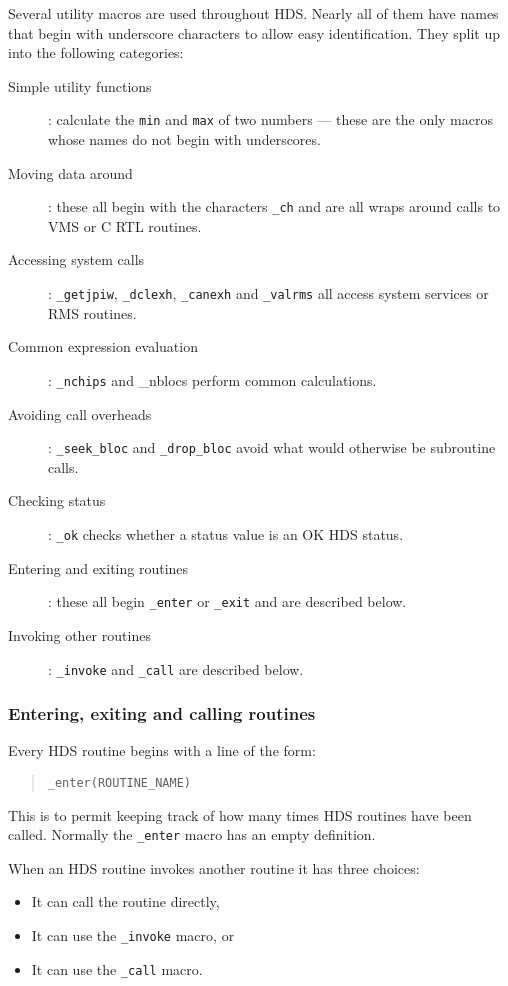 Several utility macros are used throughout HDS. Nearly all of them have
names that begin with underscore characters to allow easy identification.
They split up into the following categories:

\begin {description}
\item [Simple utility functions]: calculate the {\tt min} and {\tt max} of two
numbers --- these are the only macros whose names do not begin with underscores.
\item [Moving data around]: these all begin with the characters {\tt \_ch}
and are all wraps around calls to VMS or C RTL routines.
\item [Accessing system calls]: {\tt \_getjpiw}, {\tt \_dclexh}, {\tt \_canexh}
and {\tt \_valrms} all access system services or RMS routines.
\item [Common expression evaluation]: {\tt \_nchips} and {\_nblocs} perform
common calculations.
\item [Avoiding call overheads]: {\tt \_seek\_bloc} and {\tt \_drop\_bloc}
avoid what would otherwise be subroutine calls.
\item [Checking status]: {\tt \_ok} checks whether a status value is an
OK HDS status.
\item [Entering and exiting routines]: these all begin {\tt \_enter} or
{\tt \_exit} and are described below.
\item [Invoking other routines]: {\tt \_invoke} and {\tt \_call} are described
below.
\end {description}

\subsubsection {Entering, exiting and calling routines}

Every HDS routine begins with a line of the form:

\begin {quote}
\begin {verbatim}
_enter(ROUTINE_NAME)
\end{verbatim}
\end {quote}

This is to permit keeping track of how many times HDS routines have been
called. Normally the {\tt \_enter} macro has an empty definition.

When an HDS routine invokes another routine it has three choices:

\begin {itemize}
\item It can call the routine directly,
\item It can use the {\tt \_invoke} macro, or
\item It can use the {\tt \_call} macro.
\end {itemize}

